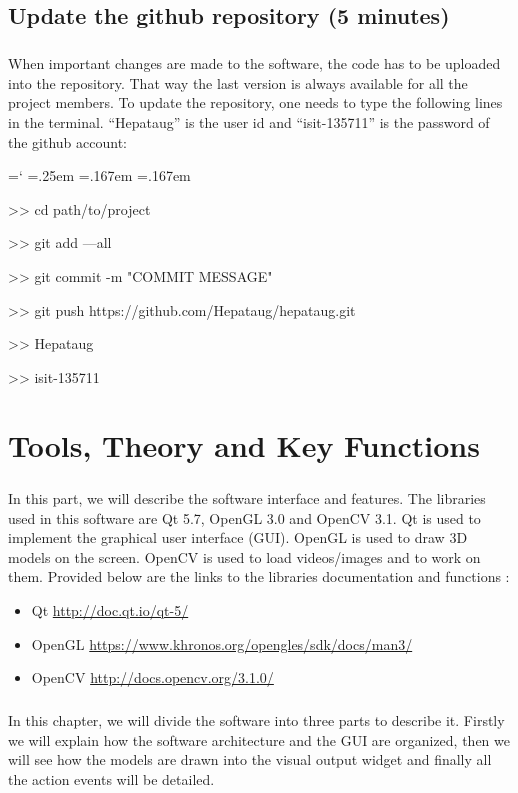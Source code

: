 \documentclass[12pt]{report}
\DeclareRobustCommand*{\ttfamily}{
  \origttfamily
  \hyphenchar\font=`\-\relax
  \fontdimen3\font=.25em\relax
  \fontdimen4\font=.167em\relax
  \fontdimen7\font=.167em\relax
}
\newenvironment{code}{\ttfamily}{}
\begin{document}
\section{Update the github repository (5 minutes)}
\paragraph{}
	When important changes are made to the software, the code has to be uploaded into the repository. That way the last version is always available for all the project members. To update the repository, one needs to type the following lines in the terminal. ``Hepataug'' is the user id and ``isit-135711'' is the password of the github account:

\begin{code}
>> cd path/to/project

>> git add ---all

>> git commit -m "COMMIT MESSAGE"

>> git push https://github.com/Hepataug/hepataug.git

>> Hepataug

>> isit-135711
\end{code}



\chapter{Tools, Theory and Key Functions} \label{sec:tools, theory and key functions}
\paragraph{}
	In this part, we will describe the software interface and features. The libraries used in this software are Qt 5.7, OpenGL 3.0 and OpenCV 3.1. Qt is used to implement the graphical user interface (GUI). OpenGL is used to draw 3D models on the screen. OpenCV is used to load videos/images and to work on them. Provided below are the links to the libraries documentation and functions :
	\begin{itemize}
	\item Qt \url{http://doc.qt.io/qt-5/}
	\item OpenGL \url{https://www.khronos.org/opengles/sdk/docs/man3/}
	\item OpenCV \url{http://docs.opencv.org/3.1.0/}
	\end{itemize}

\paragraph{}
In this chapter, we will divide the software into three parts to describe it. Firstly we will explain how the software architecture and the GUI are organized, then we will see how the models are drawn into the visual output widget and finally all the action events will be detailed.
\end{document}
